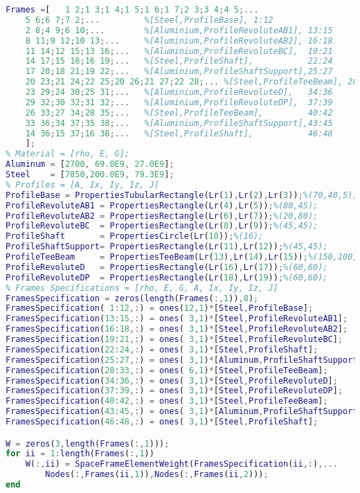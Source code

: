 \begin{lstlisting}[frame=single,language = matlab]
% Frames = [i,j]
Frames =[   1 2;1 3;1 4;1 5;1 6;1 7;2 3;3 4;4 5;...
    5 6;6 7;7 2;...         %[Steel,ProfileBase], 1:12
    2 8;4 9;6 10;...        %[Aluminium,ProfileRevoluteAB1], 13:15
    8 11;9 12;10 13;...     %[Aluminium,ProfileRevoluteAB2], 16:18
    11 14;12 15;13 16;...   %[Aluminium,ProfileRevoluteBC],  19:21
    14 17;15 18;16 19;...   %[Steel,ProfileShaft],           22:24
    17 20;18 21;19 22;...   %[Aluminium,ProfileShaftSupport],25:27
    20 23;21 24;22 25;20 26;21 27;22 28;... %[Steel,ProfileTeeBeam], 28:33
    23 29;24 30;25 31;...   %[Aluminium,ProfileRevoluteD],   34:36
    29 32;30 32;31 32;...   %[Aluminium,ProfileRevoluteDP],  37:39
    26 33;27 34;28 35;...   %[Steel,ProfileTeeBeam],         40:42
    33 36;34 37;35 38;...   %[Aluminium,ProfileShaftSupport],43:45
    14 36;15 37;16 38;...   %[Steel,ProfileShaft],           46:48
    ];
% Material = [rho, E, G];
Aluminum = [2700, 69.0E9, 27.0E9];
Steel    = [7850,200.0E9, 79.3E9];
% Profiles = [A, Ix, Iy, Iz, J]
ProfileBase = PropertiesTubularRectangle(Lr(1),Lr(2),Lr(3));%(70,40,5);
ProfileRevoluteAB1 = PropertiesRectangle(Lr(4),Lr(5));%(80,45);
ProfileRevoluteAB2 = PropertiesRectangle(Lr(6),Lr(7));%(20,80);
ProfileRevoluteBC  = PropertiesRectangle(Lr(8),Lr(9));%(45,45);
ProfileShaft       = PropertiesCircle(Lr(10));%(16);
ProfileShaftSupport= PropertiesRectangle(Lr(11),Lr(12));%(45,45);
ProfileTeeBeam     = PropertiesTeeBeam(Lr(13),Lr(14),Lr(15));%(150,100,10);
ProfileRevoluteD   = PropertiesRectangle(Lr(16),Lr(17));%(60,60);
ProfileRevoluteDP  = PropertiesRectangle(Lr(18),Lr(19));%(60,60);
% Frames Specifications = [rho, E, G, A, Ix, Iy, Iz, J]
FramesSpecification = zeros(length(Frames(:,1)),8);
FramesSpecification( 1:12,:) = ones(12,1)*[Steel,ProfileBase];
FramesSpecification(13:15,:) = ones( 3,1)*[Steel,ProfileRevoluteAB1];
FramesSpecification(16:18,:) = ones( 3,1)*[Steel,ProfileRevoluteAB2];
FramesSpecification(19:21,:) = ones( 3,1)*[Steel,ProfileRevoluteBC];
FramesSpecification(22:24,:) = ones( 3,1)*[Steel,ProfileShaft];
FramesSpecification(25:27,:) = ones( 3,1)*[Aluminum,ProfileShaftSupport];
FramesSpecification(28:33,:) = ones( 6,1)*[Steel,ProfileTeeBeam];
FramesSpecification(34:36,:) = ones( 3,1)*[Steel,ProfileRevoluteD];
FramesSpecification(37:39,:) = ones( 3,1)*[Steel,ProfileRevoluteDP];
FramesSpecification(40:42,:) = ones( 3,1)*[Steel,ProfileTeeBeam];
FramesSpecification(43:45,:) = ones( 3,1)*[Aluminum,ProfileShaftSupport];
FramesSpecification(46:48,:) = ones( 3,1)*[Steel,ProfileShaft];

W = zeros(3,length(Frames(:,1)));
for ii = 1:length(Frames(:,1))
    W(:,ii) = SpaceFrameElementWeight(FramesSpecification(ii,:),...
        Nodes(:,Frames(ii,1)),Nodes(:,Frames(ii,2)));
end


\end{lstlisting}
